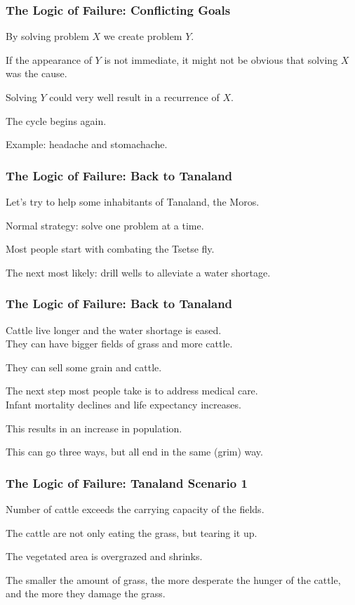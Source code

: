 \begin{frame}
\frametitle{The Logic of Failure: Conflicting Goals}
\begin{changemargin}{1cm}
By solving problem $X$ we create problem $Y$. 

If the appearance of $Y$ is not immediate, it might not be obvious that solving $X$ was the cause. 

Solving $Y$ could very well result in a recurrence of $X$. 

The cycle begins again.

Example: headache and stomachache.

\end{changemargin}
\end{frame}

\begin{frame}
\frametitle{The Logic of Failure: Back to Tanaland}
\begin{changemargin}{1cm}
Let's try to help some inhabitants of Tanaland, the Moros. 

Normal strategy: solve one problem at a time.  

Most people start with combating the Tsetse fly.

The next most likely: drill wells to alleviate a water shortage.
\end{changemargin}
\end{frame}

\begin{frame}
\frametitle{The Logic of Failure: Back to Tanaland}
\begin{changemargin}{1cm}

Cattle live longer and the water shortage is eased.\\
\quad They can have bigger fields of grass and more cattle. 

They can sell some grain and cattle.

The next step most people take is to address medical care.\\
\quad Infant mortality declines and life expectancy increases. 

This results in an increase in population. 

This can go three ways, but all end in the same (grim) way.


\end{changemargin}
\end{frame}

\begin{frame}
\frametitle{The Logic of Failure: Tanaland Scenario 1}
\begin{changemargin}{1cm}

Number of cattle exceeds the carrying capacity of the fields. 

The cattle are not only eating the grass, but tearing it up. 

The vegetated area is overgrazed and shrinks. 

The smaller the amount of grass, the more desperate the hunger of the cattle, and the more they damage the grass. 


\end{changemargin}
\end{frame}

